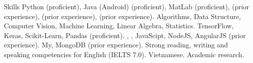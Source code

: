 
\begin{rubric}{Skills}
%
	Python (proficient), Java (Android) (proficient), MatLab (proficient),  (prior experience),  (prior experience),  (prior experience).
%
	Algorithms, Data Structure, Computer Vision, Machine Learning, Linear Algebra, Statistics.
%
	TensorFlow, Keras, Scikit-Learn, Pandas (proficient).
%
	, , JavaScipt, NodeJS, AngularJS (prior experience).
\entry*[Databases]%
	My, MongoDB (prior experience).
\entry*[Languages]%
	Strong reading, writing and speaking competencies for English (IELTS 7.0). Vietnamese.
\entry*[Misc.]%
	Academic research.
\end{rubric}